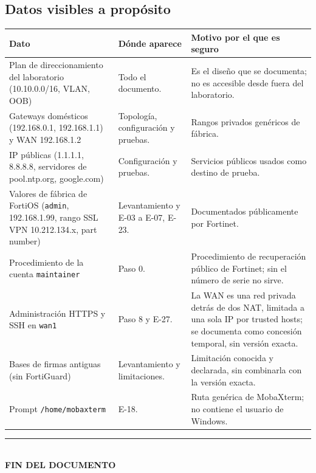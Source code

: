 \documentclass[11pt,a4paper]{article}
\begin{document}
\subsection*{Datos visibles a propósito}
{\small\noindent
\begin{tabularx}{\linewidth}{@{}P{3.4cm}P{6.2cm}Y@{}}
\toprule
{}\textbf{Dato} & \textbf{Dónde aparece} & \textbf{Motivo por el que es seguro}\\\midrule
Plan de direccionamiento del laboratorio (10.10.0.0/16, VLAN, OOB) & Todo el documento. & Es el diseño que se documenta; no es accesible desde fuera del laboratorio. \\
Gateways domésticos (192.168.0.1, 192.168.1.1) y WAN 192.168.1.2 & Topología, configuración y pruebas. & Rangos privados genéricos de fábrica. \\
IP públicas (1.1.1.1, 8.8.8.8, servidores de pool.ntp.org, google.com) & Configuración y pruebas. & Servicios públicos usados como destino de prueba. \\
Valores de fábrica de FortiOS (\texttt{admin}, 192.168.1.99, rango SSL VPN 10.212.134.x, part number) & Levantamiento y E-03 a E-07, E-23. & Documentados públicamente por Fortinet. \\
Procedimiento de la cuenta \texttt{maintainer} & Paso 0. & Procedimiento de recuperación público de Fortinet; sin el número de serie no sirve. \\
Administración HTTPS y SSH en \texttt{wan1} & Paso 8 y E-27. & La WAN es una red privada detrás de dos NAT, limitada a una sola IP por trusted hosts; se documenta como concesión temporal, sin versión exacta. \\
Bases de firmas antiguas (sin FortiGuard) & Levantamiento y limitaciones. & Limitación conocida y declarada, sin combinarla con la versión exacta. \\
Prompt \texttt{/home/mobaxterm} & E-18. & Ruta genérica de MobaXterm; no contiene el usuario de Windows. \\
\bottomrule
\end{tabularx}\par}


\par\vspace{1cm}
\begin{center}{\color{line}\rule{0.5\textwidth}{0.6pt}}\\[4pt]{\small\bfseries\color{navy} FIN DEL DOCUMENTO}\end{center}
\end{document}
